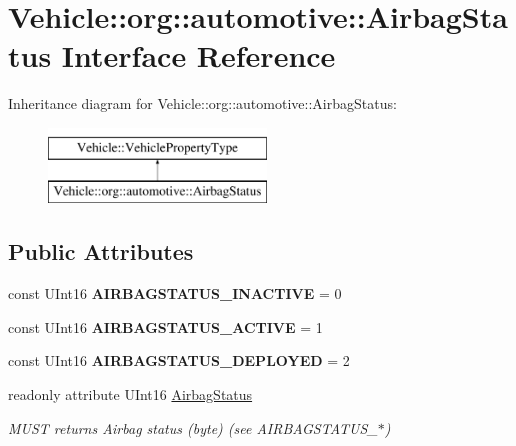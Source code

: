 \hypertarget{interfaceVehicle_1_1org_1_1automotive_1_1AirbagStatus}{\section{Vehicle\-:\-:org\-:\-:automotive\-:\-:Airbag\-Status Interface Reference}
\label{interfaceVehicle_1_1org_1_1automotive_1_1AirbagStatus}
}
Inheritance diagram for Vehicle\-:\-:org\-:\-:automotive\-:\-:Airbag\-Status\-:\begin{figure}[H]
\begin{center}
\leavevmode
\includegraphics[height=2.000000cm]{interfaceVehicle_1_1org_1_1automotive_1_1AirbagStatus}
\end{center}
\end{figure}
\subsection*{Public Attributes}
\begin{DoxyCompactItemize}
\item 
\hypertarget{interfaceVehicle_1_1org_1_1automotive_1_1AirbagStatus_a12b531a954b77bf49c9af6785c96c599}{const U\-Int16 {\bfseries A\-I\-R\-B\-A\-G\-S\-T\-A\-T\-U\-S\-\_\-\-I\-N\-A\-C\-T\-I\-V\-E} = 0}\label{interfaceVehicle_1_1org_1_1automotive_1_1AirbagStatus_a12b531a954b77bf49c9af6785c96c599}

\item 
\hypertarget{interfaceVehicle_1_1org_1_1automotive_1_1AirbagStatus_acee03b0f14ded955ce5b5d5636cd5e2c}{const U\-Int16 {\bfseries A\-I\-R\-B\-A\-G\-S\-T\-A\-T\-U\-S\-\_\-\-A\-C\-T\-I\-V\-E} = 1}\label{interfaceVehicle_1_1org_1_1automotive_1_1AirbagStatus_acee03b0f14ded955ce5b5d5636cd5e2c}

\item 
\hypertarget{interfaceVehicle_1_1org_1_1automotive_1_1AirbagStatus_afbc2e8870ab8c042bd051e380ae875a9}{const U\-Int16 {\bfseries A\-I\-R\-B\-A\-G\-S\-T\-A\-T\-U\-S\-\_\-\-D\-E\-P\-L\-O\-Y\-E\-D} = 2}\label{interfaceVehicle_1_1org_1_1automotive_1_1AirbagStatus_afbc2e8870ab8c042bd051e380ae875a9}

\item 
readonly attribute U\-Int16 \hyperlink{interfaceVehicle_1_1org_1_1automotive_1_1AirbagStatus_a5007ee19b6e0a4837f4158fc70774b17}{Airbag\-Status}
\begin{DoxyCompactList}\small\item\em M\-U\-S\-T returns Airbag status (byte) (see A\-I\-R\-B\-A\-G\-S\-T\-A\-T\-U\-S\-\_\-$\ast$) \end{DoxyCompactList}\end{DoxyCompactItemize}


